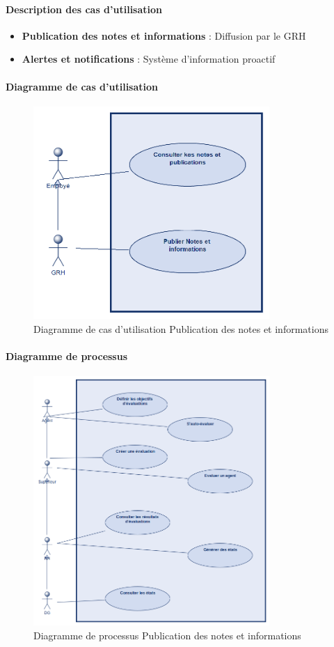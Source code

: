 \paragraph{Description des cas d'utilisation}
\begin{itemize}
    \item \textbf{Publication des notes et informations} : Diffusion par le GRH
    \item \textbf{Alertes et notifications} : Système d'information proactif
\end{itemize}

\paragraph{Diagramme de cas d'utilisation}
\begin{figure}[H]
    \centering
    \includegraphics[width=0.8\textwidth]{images/diagrammes/use-cases/note.png}
    \caption{Diagramme de cas d'utilisation Publication des notes et informations}
    \label{fig:use_case_publication}
\end{figure}

\paragraph{Diagramme de processus}
\begin{figure}[H]
    \centering
    \includegraphics[width=0.8\textwidth]{images/diagrammes/flowcharts/note.png}
    \caption{Diagramme de processus Publication des notes et informations}
    \label{fig:flow_publication}
\end{figure}

